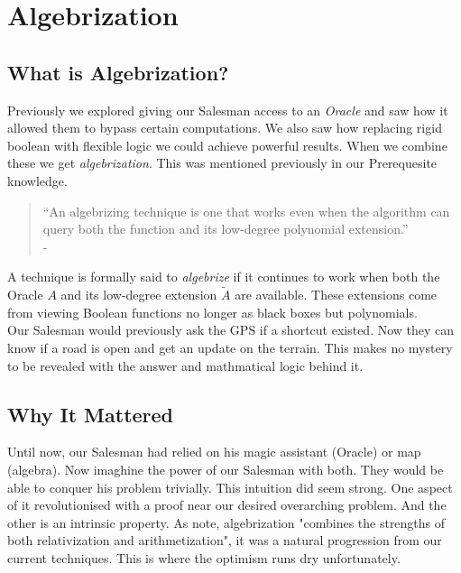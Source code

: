 \documentclass[12pt]{report}
\begin{document}
\newpage
\chapter{Algebrization}
\section{What is Algebrization?}
Previously we explored giving our Salesman access to an \textit{Oracle} and saw how it allowed them to bypass certain computations.
We also saw how replacing rigid boolean with flexible logic we could achieve powerful results.
When we combine these we get \textit{algebrization}.
This was mentioned previously in our Prerequesite knowledge.

\begin{quote}
    “An algebrizing technique is one that works even when the algorithm can query both the function and its low-degree polynomial extension.”\\
    - \cite{arora2008algebrization}
\end{quote}
A technique is formally said to \textit{algebrize} if it continues to work when both the Oracle $A$ and its low-degree extension $\tilde{A}$ are available.
These extensions come from viewing Boolean functions no longer as black boxes but polynomials.\\ 
Our Salesman would previously ask the GPS if a shortcut existed.
Now they can know if a road is open and get an update on the terrain.
This makes no mystery to be revealed with the answer and mathmatical logic behind it.

\section{Why It Mattered}
Until now, our Salesman had relied on his magic assistant (Oracle) or map (algebra).
Now imaghine the power of our Salesman with both.
They would be able to conquer his problem trivially.
This intuition did seem strong.
One aspect of it revolutionised with a proof near our desired overarching problem.
And the other is an intrinsic property.
As \cite{arora2009} note, algebrization "combines the strengths of both relativization and arithmetization", it was a natural progression from our current techniques.
This is where the optimism runs dry unfortunately.
\end{document}
